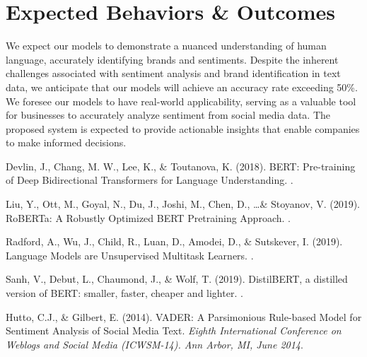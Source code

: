 \documentclass{article}
\begin{document}
\section{Expected Behaviors \& Outcomes}

We expect our models to demonstrate a nuanced understanding of human language,
accurately identifying brands and sentiments. Despite the inherent challenges
associated with sentiment analysis and brand identification in text data, we
anticipate that our models will achieve an accuracy rate exceeding 50\%. We
foresee our models to have real-world applicability, serving as a valuable tool
for businesses to accurately analyze sentiment from social media data. The
proposed system is expected to provide actionable insights that enable
companies to make informed decisions.

\newpage

\begin{thebibliography}{}

    Devlin, J., Chang, M. W., Lee, K., \& Toutanova, K. (2018). \newblock BERT:
    Pre-training of Deep Bidirectional Transformers for Language Understanding.
    .

    Liu, Y., Ott, M., Goyal, N., Du, J., Joshi, M., Chen, D., \ldots \&
    Stoyanov, V. (2019). \newblock RoBERTa: A Robustly Optimized BERT
    Pretraining
    Approach. .

    Radford, A., Wu, J., Child, R., Luan, D., Amodei, D., \& Sutskever, I.
    (2019). \newblock Language Models are Unsupervised Multitask Learners.
    .

    Sanh, V., Debut, L., Chaumond, J., \& Wolf, T. (2019). \newblock
    DistilBERT, a distilled version of BERT: smaller, faster, cheaper and
    lighter.
    .

    Hutto, C.J., \& Gilbert, E. (2014). \newblock VADER: A Parsimonious
    Rule-based Model for Sentiment Analysis of Social Media Text. \newblock
    {\em
        Eighth International Conference on Weblogs and Social Media (ICWSM-14).
        Ann
        Arbor, MI, June 2014}.

\end{thebibliography}

\thispagestyle{empty}
\end{document}
